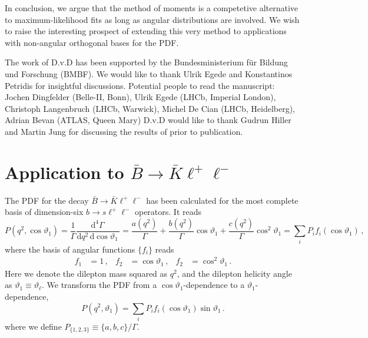\documentclass[aps,prd,reprint,nofootinbib,preprintnumbers]{revtex4}
\newcommand{\rmdx}[1]{\mbox{d} #1 \,} %
\renewcommand{\theta}{\vartheta}
\newcommand{\danny}[1]{{\color{purple}#1}}
\begin{document}
In conclusion, we argue that the method of moments is a competetive alternative to maximum-likelihood fits as long
as angular distributions are involved. We wish to raise the interesting prospect of extending this very method to
applications with non-angular orthogonal bases for the PDF.


\acknowledgments

The work of D.v.D has been supported by the Bundesministerium f\"ur Bildung und Forschung (BMBF).
We would like to thank Ulrik Egede and Konstantinos Petridis for insightful discussions.
\danny{Potential people to read the manuscript: Jochen Dingfelder (Belle-II, Bonn), Ulrik Egede (LHCb, Imperial London), Christoph Langenbruch (LHCb, Warwick), Michel De Cian (LHCb, Heidelberg), Adrian Bevan (ATLAS, Queen Mary)  }
D.v.D would like to thank Gudrun Hiller and Martin Jung for discussing the results of \cite{Das:2014sra} prior to publication.

\appendix

\section{Application to $\bar{B}\to\bar{K}\ell^+\ell^-$}
\label{app:btokll}

The PDF for the decay $\bar{B}\to\bar{K}\ell^+\ell^-$ has been calculated for the most
complete basis of dimension-six $b\to s \ell^+\ell^-$ operators. It reads \cite{Bobeth:2007dw,Bobeth:2012vn}
\begin{equation}
    P(q^2, \cos\theta_1) = \frac{1}{\Gamma} \frac{\rmdx{^4\Gamma}}{\rmdx{q^2} \rmdx{\cos\theta_1}} = \frac{a(q^2)}{\Gamma} + \frac{b(q^2)}{\Gamma} \cos\theta_1 + \frac{c(q^2)}{\Gamma} \cos^2\theta_1 = \sum_i P_i f_i(\cos\theta_1)\,,
\end{equation}
where the basis of angular functions $\lbrace f_i\rbrace$ reads
\begin{equation}
\begin{aligned}
    f_1 & = 1\,, &
    f_2 & = \cos\theta_1\,, &
    f_2 & = \cos^2\theta_1\,.
\end{aligned}
\end{equation}
Here we denote the dilepton mass squared as $q^2$, and the dilepton helicity angle as $\theta_1 \equiv \theta_{\ell}$. We transform the PDF from a $\cos\theta_1$-dependence
to a $\theta_1$-dependence,
\begin{equation}
    P(q^2, \theta_1) = \sum_i P_i f_i(\cos\theta_1) \sin \theta_1\,.
\end{equation}
where we define $P_{\lbrace 1,2,3\rbrace} \equiv \lbrace a, b, c\rbrace / \Gamma$.\\
\end{document}
